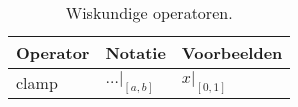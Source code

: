 \begin{table}
  \centering
  \begin{tabular}{@{}lll@{}}\toprule
    Operator       & Notatie        & Voorbeelden \\ \midrule
    clamp          & $\dots|_{[a,b]}$ & $x|_{[0, 1]}$ \\ \bottomrule
  \end{tabular}
  \caption{Wiskundige operatoren.}
  \label{tbl:math-operators}
\end{table}
